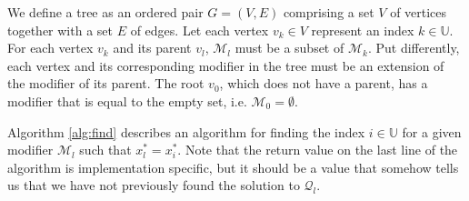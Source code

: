 

We define a tree as an ordered pair $G = (V,E)$ comprising a set $V$ of
vertices together with a set $E$ of edges.
Let each vertex $v_k \in V$ represent an index $k \in \mathbb{U}$.
For each vertex $v_k$ and its parent $v_l$, $\mathcal{M}_l$ must
be a subset of $\mathcal{M}_k$.
Put differently, each vertex and its corresponding modifier in the tree must be
an extension of the modifier of its parent.
The root $v_0$, which does not have a parent, has a modifier that is equal
to the empty set, i.e. $\mathcal{M}_0 = \emptyset$.



Algorithm \ref{alg:find} describes an algorithm for finding the index
$i \in \mathbb{U}$ for a given modifier $\mathcal{M}_l$ such that
$x_l^* = x_i^*$.
Note that the return value
on the last line of the algorithm is implementation specific, but it should be
a value that somehow tells us that we have not previously found the solution to
$\mathcal{Q}_l$.

